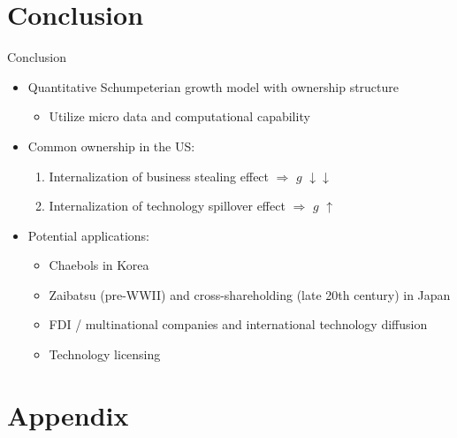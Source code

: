 \documentclass[
  10pt,
  aspectratio=169,   %
]{beamer}
\theoremstyle{plain}
\begin{document}
\section{Conclusion}
\begin{frame}{Conclusion}
  \begin{itemize}
    \item Quantitative Schumpeterian growth model with ownership structure
    \begin{itemize}
      \item Utilize micro data and computational capability
    \end{itemize}
    \medskip{}
    \item Common ownership in the US:
    \begin{enumerate}
      \item Internalization of business stealing effect $\Longrightarrow$ $g$ $\downarrow$$\downarrow$
      \item Internalization of technology spillover effect $\Longrightarrow$ $g$ $\uparrow$
    \end{enumerate}
    \medskip{}
    \item Potential applications:
    \begin{itemize}
      \item Chaebols in Korea
      \item Zaibatsu (pre-WWII) and cross-shareholding (late 20th century) in Japan
      \item FDI / multinational companies and international technology diffusion
      \item Technology licensing
    \end{itemize}
  \end{itemize}
\end{frame}

\appendix
\section{Appendix}
\end{document}
